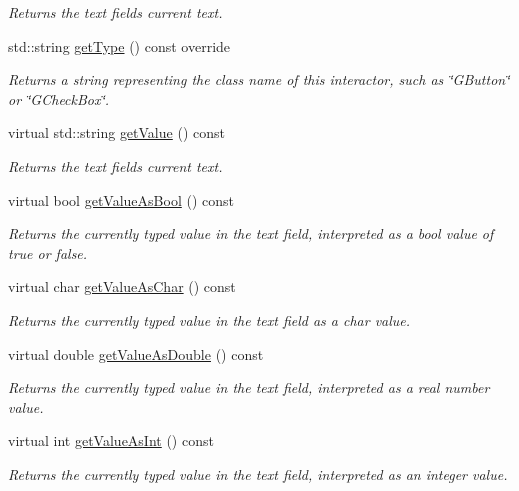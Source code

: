 \begin{DoxyCompactItemize}
\begin{DoxyCompactList}\small\item\em Returns the text field\textquotesingle{}s current text. \end{DoxyCompactList}\item 
std\+::string \mbox{\hyperlink{classGTextField_a9b72ede4ee8520f987a0c01e30654814}{get\+Type}} () const override
\begin{DoxyCompactList}\small\item\em Returns a string representing the class name of this interactor, such as \char`\"{}\+G\+Button\char`\"{} or \char`\"{}\+G\+Check\+Box\char`\"{}. \end{DoxyCompactList}\item 
virtual std\+::string \mbox{\hyperlink{classGTextField_a2a03038d2e299f486e55dc72778f7086}{get\+Value}} () const
\begin{DoxyCompactList}\small\item\em Returns the text field\textquotesingle{}s current text. \end{DoxyCompactList}\item 
virtual bool \mbox{\hyperlink{classGTextField_a8190c918ce29007223898c9d511b17ee}{get\+Value\+As\+Bool}} () const
\begin{DoxyCompactList}\small\item\em Returns the currently typed value in the text field, interpreted as a bool value of true or false. \end{DoxyCompactList}\item 
virtual char \mbox{\hyperlink{classGTextField_a562f514fc055aaa37ca3145fc7abde8e}{get\+Value\+As\+Char}} () const
\begin{DoxyCompactList}\small\item\em Returns the currently typed value in the text field as a char value. \end{DoxyCompactList}\item 
virtual double \mbox{\hyperlink{classGTextField_aab9a19edbd1548d557721e0b695295f8}{get\+Value\+As\+Double}} () const
\begin{DoxyCompactList}\small\item\em Returns the currently typed value in the text field, interpreted as a real number value. \end{DoxyCompactList}\item 
virtual int \mbox{\hyperlink{classGTextField_a5e50caa202955b726a44a1dfbc6f7818}{get\+Value\+As\+Int}} () const
\begin{DoxyCompactList}\small\item\em Returns the currently typed value in the text field, interpreted as an integer value. \end{DoxyCompactList}\item 

\end{DoxyCompactItemize}

